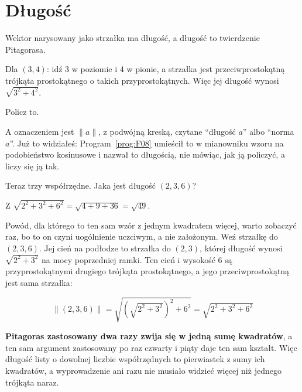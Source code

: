 \section{Długość}
\label{sec:F09-length}

\begin{fr}
Wektor narysowany jako strzałka ma długość, a długość to twierdzenie
Pitagorasa.

Dla $(3, 4)$: idź $3$ w poziomie i $4$ w pionie, a strzałka jest
przeciwprostokątną trójkąta prostokątnego o takich przyprostokątnych. Więc jej
długość wynosi $\sqrt{3^{2} + 4^{2}}$.

Policz to.
\nextframe
\end{fr}

\begin{fr}
A oznaczeniem jest $\lVert a \rVert$, z podwójną kreską, czytane
\enquote{długość $a$} albo \enquote{norma $a$}. Już to widziałeś:
Program~\ref{prog:F08} umieścił to w mianowniku wzoru na podobieństwo
kosinusowe i nazwał to długością, nie mówiąc, jak ją policzyć, a liczy się ją
tak.

Teraz trzy współrzędne. Jaka jest długość $(2, 3, 6)$?
\dotline
\nextframe
\end{fr}

\begin{fr}
Z $\sqrt{2^{2} + 3^{2} + 6^{2}} = \sqrt{4 + 9 + 36} = \sqrt{49}$.

Powód, dla którego to ten sam wzór z jednym kwadratem więcej, warto zobaczyć
raz, bo to on czyni uogólnienie uczciwym, a nie założonym. Weź strzałkę do
$(2, 3, 6)$. Jej cień na podłodze to strzałka do $(2, 3)$, której długość
wynosi $\sqrt{2^{2} + 3^{2}}$ na mocy poprzedniej ramki. Ten cień i wysokość
$6$ są przyprostokątnymi drugiego trójkąta prostokątnego, a jego
przeciwprostokątną jest sama strzałka:

\[ \lVert (2, 3, 6) \rVert = \sqrt{\left(\sqrt{2^{2} + 3^{2}}\right)^{2} + 6^{2}}
   = \sqrt{2^{2} + 3^{2} + 6^{2}} \]

\textbf{Pitagoras zastosowany dwa razy zwija się w jedną sumę kwadratów}, a
ten sam argument zastosowany po raz czwarty i piąty daje ten sam kształt. Więc
długość listy o dowolnej liczbie współrzędnych to pierwiastek z sumy ich
kwadratów, a wyprowadzenie ani razu nie musiało widzieć więcej niż jednego
trójkąta naraz.

\end{fr}

